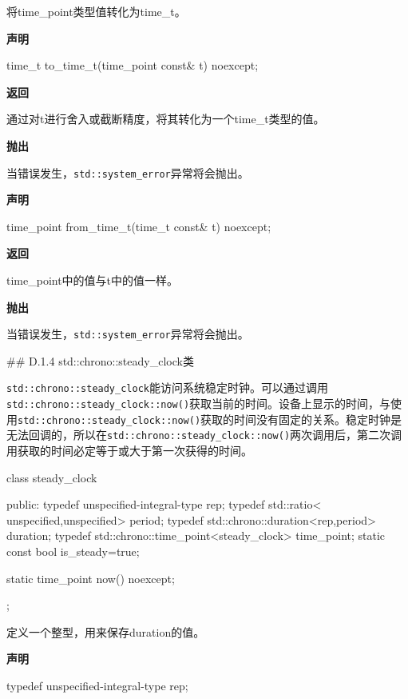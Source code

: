 将time\_point类型值转化为time\_t。

\textbf{声明}

\begin{cpp}
time_t to_time_t(time_point const& t) noexcept;
\end{cpp}

\textbf{返回}

通过对t进行舍入或截断精度，将其转化为一个time\_t类型的值。

\textbf{抛出}

当错误发生，\texttt{std::system\_error}异常将会抛出。


\textbf{声明}

\begin{cpp}
time_point from_time_t(time_t const& t) noexcept;
\end{cpp}

\textbf{返回}

time\_point中的值与t中的值一样。

\textbf{抛出}

当错误发生，\texttt{std::system\_error}异常将会抛出。

## D.1.4 std::chrono::steady\_clock类

\texttt{std::chrono::steady\_clock}能访问系统稳定时钟。可以通过调用\texttt{std::chrono::steady\_clock::now()}获取当前的时间。设备上显示的时间，与使用\texttt{std::chrono::steady\_clock::now()}获取的时间没有固定的关系。稳定时钟是无法回调的，所以在\texttt{std::chrono::steady\_clock::now()}两次调用后，第二次调用获取的时间必定等于或大于第一次获得的时间。


\begin{cpp}
class steady_clock
{
public:
  typedef unspecified-integral-type rep;
  typedef std::ratio<
      unspecified,unspecified> period;
  typedef std::chrono::duration<rep,period> duration;
  typedef std::chrono::time_point<steady_clock>
      time_point;
  static const bool is_steady=true;

  static time_point now() noexcept;
};
\end{cpp}


定义一个整型，用来保存duration的值。

\textbf{声明}

\begin{cpp}
typedef unspecified-integral-type rep;
\end{cpp}

